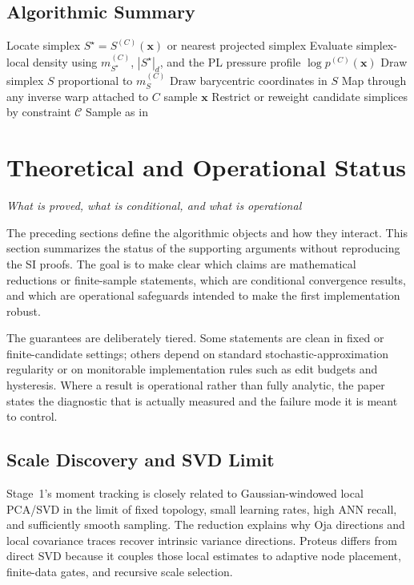 \documentclass[11pt]{article}
\newcommand{\sectionsubtitle}[1]{\vspace{-0.25em}\noindent\textit{#1}\par\vspace{0.75em}}
\theoremstyle{definition}
\theoremstyle{plain}
\begin{document}
\subsection{Algorithmic Summary}
\begin{algorithm}[t]
\caption{Inference interface (paper view)}
\label{alg:paper-inference}
\begin{algorithmic}[1]
    \State Locate simplex $S^\star=S^{(C)}(\mathbf x)$ or nearest projected simplex
    \State Evaluate simplex-local density using $m_{S^\star}^{(C)}$, $|S^\star|_d$, and the PL pressure profile
    \State \Return $\log p^{(C)}(\mathbf x)$
\EndProcedure
{}
    \State Draw simplex $S$ proportional to $m_S^{(C)}$
    \State Draw barycentric coordinates in $S$
    \State Map through any inverse warp attached to $C$
    \State \Return sample $\mathbf x$
\EndProcedure
{}
    \State Restrict or reweight candidate simplices by constraint $\mathcal C$
    \State Sample as in 
\EndProcedure
\end{algorithmic}
\end{algorithm}

\section{Theoretical and Operational Status}
\label{sec:theory-status}
\sectionsubtitle{What is proved, what is conditional, and what is operational}

The preceding sections define the algorithmic objects and how they interact. This section summarizes the status of the supporting arguments without reproducing the SI proofs. The goal is to make clear which claims are mathematical reductions or finite-sample statements, which are conditional convergence results, and which are operational safeguards intended to make the first implementation robust.

The guarantees are deliberately tiered. Some statements are clean in fixed or finite-candidate settings; others depend on standard stochastic-approximation regularity or on monitorable implementation rules such as edit budgets and hysteresis. Where a result is operational rather than fully analytic, the paper states the diagnostic that is actually measured and the failure mode it is meant to control.

\subsection{Scale Discovery and SVD Limit}
Stage~1's moment tracking is closely related to Gaussian-windowed local PCA/SVD in the limit of fixed topology, small learning rates, high ANN recall, and sufficiently smooth sampling. The reduction explains why Oja directions and local covariance traces recover intrinsic variance directions. Proteus differs from direct SVD because it couples those local estimates to adaptive node placement, finite-data gates, and recursive scale selection.
\end{document}
